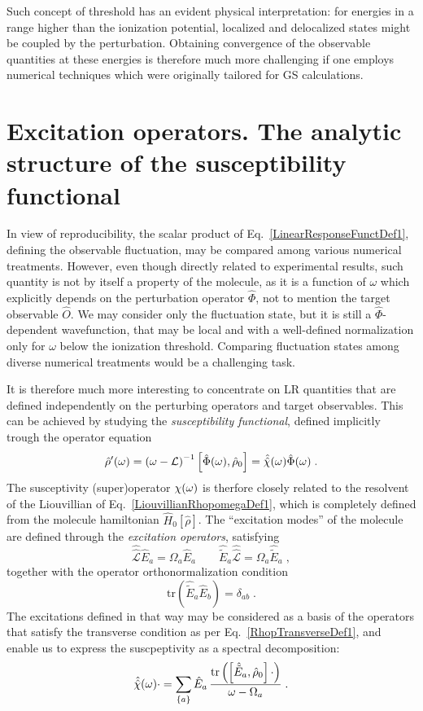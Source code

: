 \documentclass[reprint,aps,prb]{revtex4-1}
\newcommand{\be}{\begin{equation}}
\newcommand{\ee}{\end{equation}}
\newcommand{\qq}{\qquad}
\newcommand{\lb}{\label}
\newcommand{\op}[1]{\hat {#1}}
\newcommand{\sop}[1]{\op{\op {#1}}}
\newcommand{\commutator}[2]{\left[ {#1} , {#2} \right]}
\newcommand{\trace}[1]{\mathrm{tr}\left(#1\right)}
\newcommand{\dmnot}{\op{\rho}_0}
\newcommand{\dm}{\op{\rho}}
\newcommand{\hnot}{\op{H}_0}
\newcommand{\Liouv}{\sop{\mathcal L}}
\begin{document}
Such concept of threshold has an evident physical interpretation: for energies in a range higher than the ionization potential,
localized and delocalized states might be coupled by the perturbation. Obtaining convergence of the observable quantities at these energies is therefore much more challenging if one employs 
numerical techniques which were originally tailored for GS calculations.

\section{Excitation operators. The analytic structure of the susceptibility functional}

In view of reproducibility, the scalar product of Eq.~\eqref{LinearResponseFunctDef1}, defining the observable fluctuation, may be compared among various numerical treatments.
However, even though directly related to experimental results, such quantity is not by itself a property of the molecule, as it is a function of $\omega$ which explicitly depends on the perturbation operator $\op \Phi$, not to mention 
the target observable $\op O$. We may consider only the fluctuation state, but it is still a $\op \Phi$-dependent wavefunction, that may be local and with a well-defined normalization only for $\omega$ below the ionization threshold.
Comparing fluctuation states among diverse numerical treatments would be a challenging task.

It is therefore much more interesting to concentrate on LR quantities that are
defined independently on the perturbing operators and target observables.
This can be achieved by studying the 
\emph{susceptibility functional}, defined implicitly trough the operator equation  
\be\lb{SusceptibilityDef1}
\dm'(\omega) = \left(\omega -\mathcal L \right)^{-1} \commutator{\op \Phi(\omega)}{\dmnot} = \sop{{\cal \chi}}(\omega) \op\Phi(\omega) \;. 
\ee
The susceptivity (super)operator $\cal \chi(\omega)$ is therfore closely related to the resolvent of the Liouvillian of Eq.~\eqref{LiouvillianRhopomegaDef1}, which is completely defined 
from the molecule hamiltonian $\hnot[\dm]$.
The ``excitation modes''  of the molecule are defined through the \emph{excitation operators}, satisfying
\be\lb{ExcitationOperatorsDef1}
\Liouv \op E_a = \Omega_a \op E_a \qq \op{\tilde E}_a \Liouv = \Omega_a \op{\tilde E}_a \;,
\ee
together with the operator orthonormalization condition %
\be\lb{orthoExcitatioOpDef1}
\trace{\op{\tilde E}_a\op E_b} = \delta_{ab} \;.
\ee
The excitations defined in that way may be considered as a basis of the operators that satisfy the transverse condition as per 
Eq.~\eqref{RhopTransverseDef1}, and enable us to express the suscpeptivity as a spectral decomposition:
\be\lb{RhopExcitationDef1}
\sop{{\cal \chi}}(\omega) \cdot   = \sum_{\{a\}} \op E_{a} \,
\frac{\trace{\commutator{\op{\tilde E}_a}{\dmnot}\cdot}}{\omega-\Omega_a} \;.
\ee 
\end{document}
